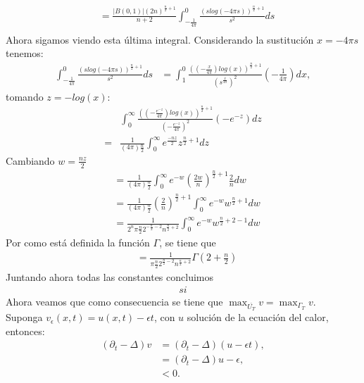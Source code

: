 \begin{homeworkProblem}
\begin{solucion}
\begin{align*}
      &= \frac{|B(0,1)|(2n)^{\frac{n}{2} + 1}}{n+2} \int_{-\frac{1}{4\pi}}^{0} \frac{(slog(-4\pi s))^{\frac{n}{2} + 1}}{s^{2}} ds\\ 
    \end{align*}
    Ahora sigamos viendo esta última integral. Considerando la sustitución $x = -4\pi s$ tenemos:
    \begin{align*}
      \int_{-\frac{1}{4\pi}}^{0} \frac{(slog(-4\pi s))^{\frac{n}{2} + 1}}{s^{2}} ds &= \int_{1}^{0} \frac{((-\frac{x}{4\pi})log(x))^{\frac{n}{2}+1}}{(s^\frac{x}{4\pi})^{2}}(- \frac{1}{4\pi})dx,
    \end{align*}
    tomando $z = -log(x)$:
    \begin{align*}
      &\int_{0}^{\infty} \frac{((-\frac{e^{-z}}{4\pi})log(x))^{\frac{n}{2}+1}}{(-\frac{e^{-z}}{4\pi})^{2}}(-e^{-z})dz\\
      =& \frac{1}{(4\pi){\frac{n}{2}}} \int_{0}^{\infty} e^{\frac{-nz}{2}}z^{\frac{n}{2}+1}dz
    \end{align*}
    Cambiando $w=\frac{nz}{2}$
    \begin{align*}
      &= \frac{1}{(4\pi){\frac{n}{2}}} \int_{0}^{\infty} e^{-w}(\frac{2w}{n})^{\frac{n}{2}+1}\frac{2}{n}dw\\ 
      &= \frac{1}{(4\pi){\frac{n}{2}}} (\frac{2}{n})^{\frac{n}{2}+1} \int_{0}^{\infty} e^{-w} w^{\frac{n}{2}+1}dw\\ 
      &= \frac{1}{2^{n} \pi{\frac{n}{2}} 2^{-\frac{n}{2}-2} n^{\frac{n}{2}+2}} \int_{0}^{\infty} e^{-w} w^{\frac{n}{2}+2-1}dw  
    \end{align*}
    Por como está definida la función $\Gamma$, se tiene que
    \begin{align*}
      &= \frac{1}{\pi{\frac{n}{2}} 2^{\frac{n}{2}-2} n^{\frac{n}{2}+2}} \Gamma (2 + \frac{n}{2})
    \end{align*}
    Juntando ahora todas las constantes concluimos
    \begin{align*}
      si
    \end{align*}
    \demostrado
    Ahora veamos que como consecuencia se tiene que $\max_{\overline{U_T}}v=\max_{\Gamma_T}v$.\\
    Suponga $v_{\epsilon}(x,t)=u(x,t)-\epsilon t$, con $u$ solución de la ecuación del calor, entonces:
    \begin{align*}
      (\partial_t-\Delta)v&=(\partial_t-\Delta)(u-\epsilon t),\\
      &=(\partial_t-\Delta)u - \epsilon,\\
      &< 0 .
    \end{align*}

\end{solucion}
\end{homeworkProblem}
